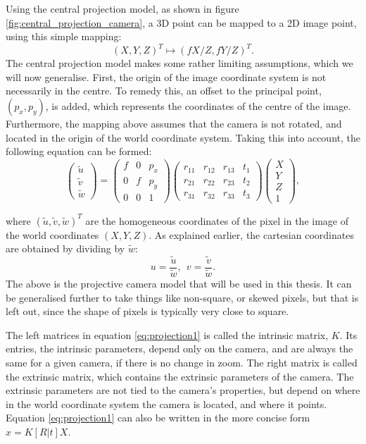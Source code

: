 Using the central projection model, as shown in figure \ref{fig:central_projection_camera}, a 3D point can be mapped to a 2D image point, using this simple mapping: $$(X,Y,Z)^T\mapsto(fX/Z,fY/Z)^T.$$
The central projection model makes some rather limiting assumptions, which we will now generalise.
First, the origin of the image coordinate system is not necessarily in the centre.
To remedy this, an offset to the principal point, $(p_{x}, p_{y})$, is added, which represents the coordinates of the centre of the image.
Furthermore, the mapping above assumes that the camera is not rotated, and located in the origin of the world coordinate system. Taking this into account, the following equation can be formed:
\begin{equation}\label{eq:projection1}
\begin{pmatrix}	\tilde{u}\\\tilde{v}\\\tilde{w}\end{pmatrix} = 
\begin{pmatrix}
	f & 0 & p_{x}\\
	0 & f & p_{y}\\
	0 & 0 & 1
\end{pmatrix}
\begin{pmatrix}
	r_{11} & r_{12} & r_{13} & t_{1}\\
	r_{21} & r_{22} & r_{23} & t_{2}\\
	r_{31} & r_{32} & r_{33} & t_{3}
\end{pmatrix}
\begin{pmatrix}	X\\Y\\Z\\1\end{pmatrix},
\end{equation}

where $(\tilde{u},\tilde{v},\tilde{w})^T$ are the homogeneous coordinates of the pixel in the image of the world coordinates $(X,Y,Z)$.
As explained earlier, the cartesian coordinates are obtained by dividing by $\tilde{w}$:
$$
u = \frac{\tilde{u}}{\tilde{w}},~~v = \frac{\tilde{v}}{\tilde{w}}.
$$
The above is the projective camera model that will be used in this thesis. 
It can be generalised further to take things like non-square, or skewed pixels, but that is left out, since the shape of pixels is typically very close to square.

The left matrices in equation \ref{eq:projection1} is called the intrinsic matrix, $K$.
Its entries, the intrinsic parameters, depend only on the camera, and are always the same for a given camera, if there is no change in zoom.
The right matrix is called the extrinsic matrix, which contains the extrinsic parameters of the camera.
The extrinsic parameters are not tied to the camera's properties, but depend on where in the world coordinate system the camera is located, and where it points.
Equation \ref{eq:projection1} can also be written in the more concise form $x = K[R|t]X$.

